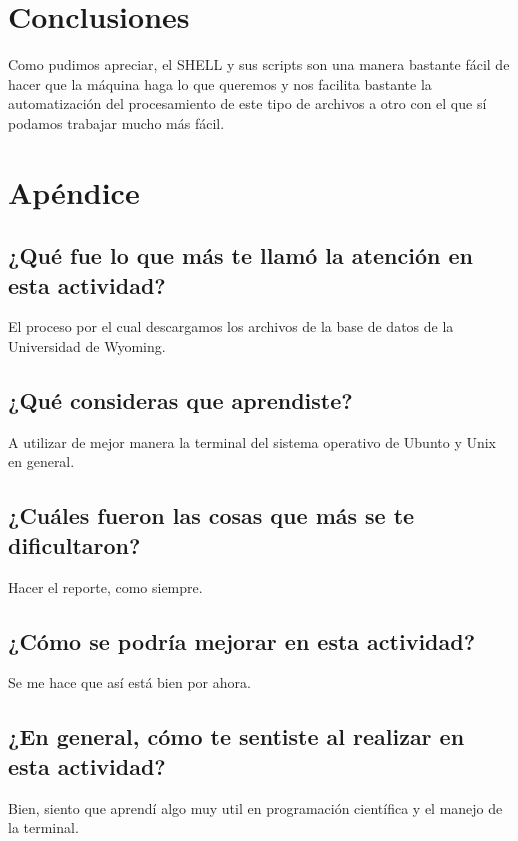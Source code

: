 \documentclass{article}
\begin{document}
\section{Conclusiones}
Como pudimos apreciar, el SHELL y sus scripts son una manera bastante fácil de hacer que la máquina haga lo que queremos y nos facilita bastante la automatización del procesamiento de este tipo de archivos a otro con el que sí podamos trabajar mucho más fácil.

\newpage

\section{Apéndice}
\subsection{¿Qué fue lo que más te llamó la atención en esta actividad?}
El proceso por el cual descargamos los archivos de la base de datos de la Universidad de Wyoming.
\subsection{¿Qué consideras que aprendiste?}
A utilizar de mejor manera la terminal del sistema operativo de Ubunto y Unix en general.
\subsection{¿Cuáles fueron las cosas que más se te dificultaron?}
Hacer el reporte, como siempre.
\subsection{¿Cómo se podría mejorar en esta actividad?}
Se me hace que así está bien por ahora.
\subsection{¿En general, cómo te sentiste al realizar en esta actividad?}
Bien, siento que aprendí algo muy util en programación científica y el manejo de la terminal.
\end{document}
